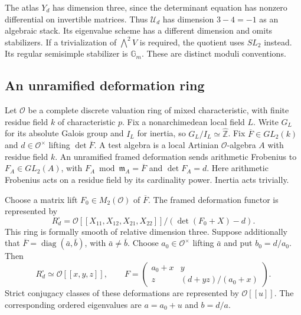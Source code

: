 The atlas $Y_d$ has dimension three, since the determinant equation
has nonzero differential on invertible matrices.
Thus $\mathcal U_d$ has dimension $3-4=-1$ as an algebraic stack.
Its eigenvalue scheme has a different dimension and omits stabilizers.
If a trivialization of $\bigwedge^2V$ is required, the quotient uses
$SL_2$ instead. Its regular semisimple stabilizer is $\mathbb G_m$.
These are distinct moduli conventions.

\subsection{An unramified deformation ring}

Let $\mathcal O$ be a complete discrete valuation ring of mixed
characteristic, with finite residue field $k$ of characteristic $p$.
Fix a nonarchimedean local field $L$. Write $G_L$ for its absolute
Galois group and $I_L$ for inertia, so $G_L/I_L\simeq\widehat{\mathbb Z}$.
Fix $\overline F\in GL_2(k)$ and $d\in\mathcal O^\times$ lifting
$\det\overline F$. A test algebra is a local Artinian
$\mathcal O$-algebra $A$ with residue field $k$.
An unramified framed deformation sends arithmetic Frobenius to
$F_A\in GL_2(A)$, with $F_A\bmod\mathfrak m_A=\overline F$
and $\det F_A=d$.
Here arithmetic Frobenius acts on a residue field by its cardinality
power. Inertia acts trivially.

\begin{proposition}
\label{v4-arith:w5-e:local:framed-unramified}
Choose a matrix lift $F_0\in M_2(\mathcal O)$ of $\overline F$.
The framed deformation functor is represented by
\[
 R_d^\square=
 \mathcal O[[X_{11},X_{12},X_{21},X_{22}]]/
       (\det(F_0+X)-d).
\]
This ring is formally smooth of relative dimension three.
Suppose additionally that
$\overline F=\operatorname{diag}(\bar a,\bar b)$, with
$\bar a\ne\bar b$. Choose $a_0\in\mathcal O^\times$ lifting $\bar a$
and put $b_0=d/a_0$. Then
\[
 R_d^\square\simeq\mathcal O[[x,y,z]],\qquad
 F=\begin{pmatrix}
 a_0+x&y\\ z&(d+yz)/(a_0+x)
 \end{pmatrix}.
\]
Strict conjugacy classes of these deformations are represented by
$\mathcal O[[u]]$. The corresponding ordered eigenvalues are
$a=a_0+u$ and $b=d/a$.
\end{proposition}

